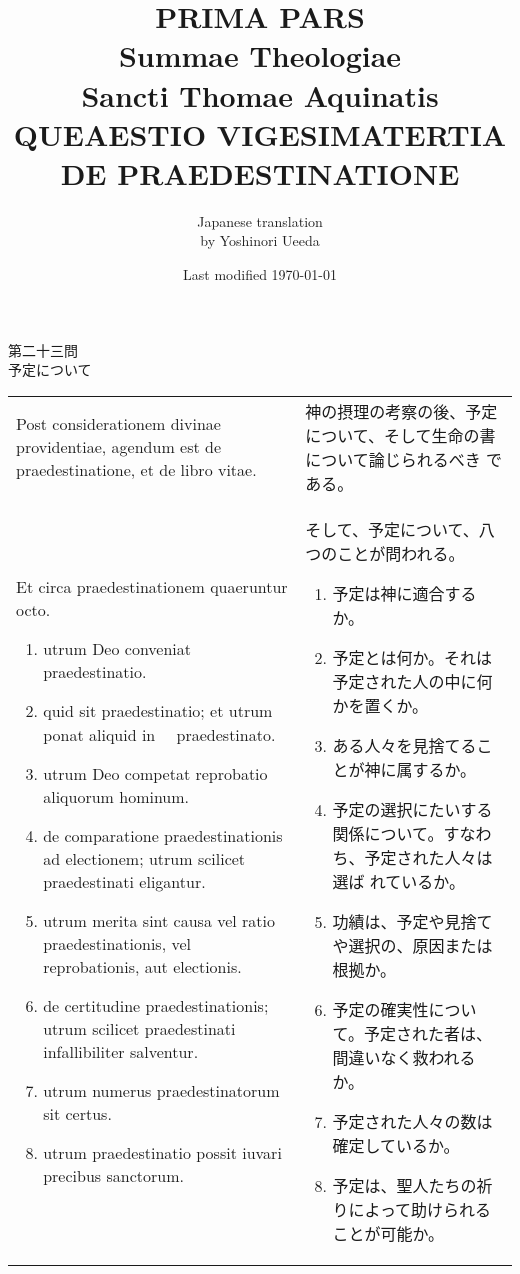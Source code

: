 \documentclass[10pt]{jsarticle} %
\title{{\bf PRIMA PARS}\\{\HUGE Summae Theologiae}\\Sancti Thomae
Aquinatis\\{\sffamily QUEAESTIO VIGESIMATERTIA}\\DE PRAEDESTINATIONE}
\author{Japanese translation\\by Yoshinori {\sc Ueeda}}
\date{Last modified \today}
\begin{document}
\maketitle
\pagestyle{fancy}


\begin{center}
{\Large 第二十三問\\予定について}
\end{center}


\begin{longtable}{p{21em}p{21em}}


Post considerationem divinae providentiae, agendum est de
 praedestinatione, et de libro vitae. 

&

 神の摂理の考察の後、予定について、そして生命の書について論じられるべき
 である。
 

\\


 Et circa praedestinationem
 quaeruntur octo.
\begin{enumerate}
 \item utrum Deo conveniat praedestinatio.
 \item quid sit praedestinatio; et utrum ponat aliquid in　 praedestinato.
 \item utrum Deo competat reprobatio aliquorum hominum.
 \item de comparatione praedestinationis ad electionem; utrum scilicet
       praedestinati eligantur.
 \item utrum merita sint causa vel ratio praedestinationis, vel
       reprobationis, aut electionis.
 \item de certitudine praedestinationis; utrum scilicet praedestinati
       infallibiliter salventur.
 \item utrum numerus praedestinatorum sit certus.
 \item utrum praedestinatio possit iuvari precibus sanctorum.
\end{enumerate}

&

そして、予定について、八つのことが問われる。

\begin{enumerate}
 \item 予定は神に適合するか。
 \item 予定とは何か。それは予定された人の中に何かを置くか。
 \item ある人々を見捨てることが神に属するか。
 \item 予定の選択にたいする関係について。すなわち、予定された人々は選ば
       れているか。
 \item 功績は、予定や見捨てや選択の、原因または根拠か。
 \item 予定の確実性について。予定された者は、間違いなく救われるか。
 \item 予定された人々の数は確定しているか。
 \item 予定は、聖人たちの祈りによって助けられることが可能か。
\end{enumerate}


\end{longtable}
\end{document}
